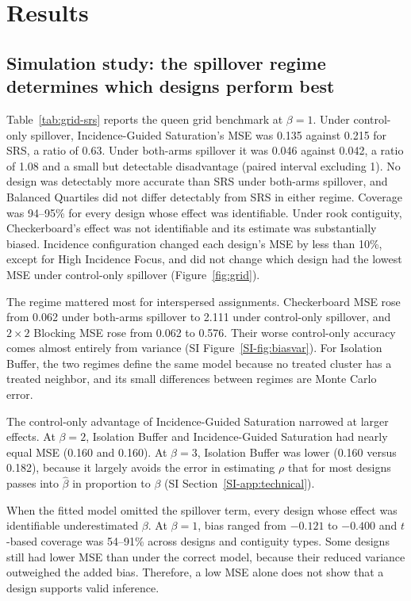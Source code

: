 \documentclass[Afour,sagev,times]{sagej}
\begin{document}
\section{Results}
\subsection{Simulation study: the spillover regime determines which designs perform best}
Table~\ref{tab:grid-srs} reports the queen grid benchmark at $\beta=1$. Under control-only spillover, Incidence-Guided Saturation's MSE was 0.135 against 0.215 for SRS, a ratio of 0.63. Under both-arms spillover it was 0.046 against 0.042, a ratio of 1.08 and a small but detectable disadvantage (paired interval excluding 1). No design was detectably more accurate than SRS under both-arms spillover, and Balanced Quartiles did not differ detectably from SRS in either regime. Coverage was 94--95\% for every design whose effect was identifiable. Under rook contiguity, Checkerboard's effect was not identifiable and its estimate was substantially biased. Incidence configuration changed each design's MSE by less than 10\%, except for High Incidence Focus, and did not change which design had the lowest MSE under control-only spillover (Figure~\ref{fig:grid}).
\ifctjreading
\CTJGridTable
\CTJGridFigure
\CTJAllocationFigure
\fi

The regime mattered most for interspersed assignments. Checkerboard MSE rose from 0.062 under both-arms spillover to 2.111 under control-only spillover, and $2\times2$ Blocking MSE rose from 0.062 to 0.576. Their worse control-only accuracy comes almost entirely from variance (SI Figure~\ref{SI-fig:biasvar}). For Isolation Buffer, the two regimes define the same model because no treated cluster has a treated neighbor, and its small differences between regimes are Monte Carlo error.

The control-only advantage of Incidence-Guided Saturation narrowed at larger effects. At $\beta=2$, Isolation Buffer and Incidence-Guided Saturation had nearly equal MSE (0.160 and 0.160). At $\beta=3$, Isolation Buffer was lower (0.160 versus 0.182), because it largely avoids the error in estimating $\rho$ that for most designs passes into $\hat\beta$ in proportion to $\beta$ (SI Section~\ref{SI-app:technical}).

When the fitted model omitted the spillover term, every design whose effect was identifiable underestimated $\beta$. At $\beta=1$, bias ranged from $-0.121$ to $-0.400$ and $t$-based coverage was 54--91\% across designs and contiguity types. Some designs still had lower MSE than under the correct model, because their reduced variance outweighed the added bias. Therefore, a low MSE alone does not show that a design supports valid inference.
\end{document}
